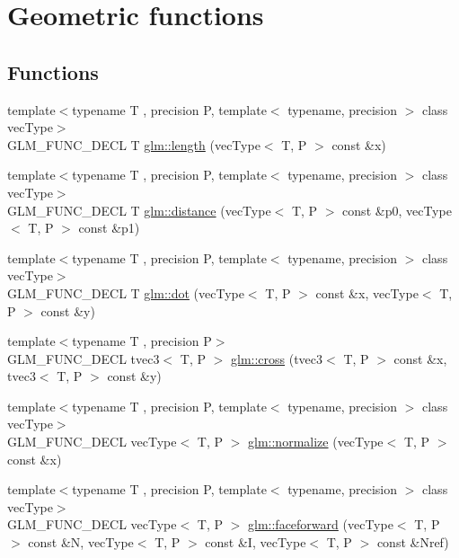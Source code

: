 \hypertarget{group__core__func__geometric}{\section{Geometric functions}
\label{group__core__func__geometric}
}
\subsection*{Functions}
\begin{DoxyCompactItemize}
\item 
{\footnotesize template$<$typename T , precision P, template$<$ typename, precision $>$ class vec\-Type$>$ }\\G\-L\-M\-\_\-\-F\-U\-N\-C\-\_\-\-D\-E\-C\-L T \hyperlink{group__core__func__geometric_ga18d45e3d4c7705e67ccfabd99e521604}{glm\-::length} (vec\-Type$<$ T, P $>$ const \&x)
\item 
{\footnotesize template$<$typename T , precision P, template$<$ typename, precision $>$ class vec\-Type$>$ }\\G\-L\-M\-\_\-\-F\-U\-N\-C\-\_\-\-D\-E\-C\-L T \hyperlink{group__core__func__geometric_ga7ca317dde0d7e94d920153554d4a02a8}{glm\-::distance} (vec\-Type$<$ T, P $>$ const \&p0, vec\-Type$<$ T, P $>$ const \&p1)
\item 
{\footnotesize template$<$typename T , precision P, template$<$ typename, precision $>$ class vec\-Type$>$ }\\G\-L\-M\-\_\-\-F\-U\-N\-C\-\_\-\-D\-E\-C\-L T \hyperlink{group__core__func__geometric_ga7dada304da2ba7dd3376ab4f178c3f6b}{glm\-::dot} (vec\-Type$<$ T, P $>$ const \&x, vec\-Type$<$ T, P $>$ const \&y)
\item 
{\footnotesize template$<$typename T , precision P$>$ }\\G\-L\-M\-\_\-\-F\-U\-N\-C\-\_\-\-D\-E\-C\-L tvec3$<$ T, P $>$ \hyperlink{group__core__func__geometric_gafe2cae8cb26fd44be62aee97369d0af8}{glm\-::cross} (tvec3$<$ T, P $>$ const \&x, tvec3$<$ T, P $>$ const \&y)
\item 
{\footnotesize template$<$typename T , precision P, template$<$ typename, precision $>$ class vec\-Type$>$ }\\G\-L\-M\-\_\-\-F\-U\-N\-C\-\_\-\-D\-E\-C\-L vec\-Type$<$ T, P $>$ \hyperlink{group__core__func__geometric_gada9451ec170a36fe53552812b9c03a68}{glm\-::normalize} (vec\-Type$<$ T, P $>$ const \&x)
\item 
{\footnotesize template$<$typename T , precision P, template$<$ typename, precision $>$ class vec\-Type$>$ }\\G\-L\-M\-\_\-\-F\-U\-N\-C\-\_\-\-D\-E\-C\-L vec\-Type$<$ T, P $>$ \hyperlink{group__core__func__geometric_gaea854e5aec1b5839832ac2dfc7cd3c0d}{glm\-::faceforward} (vec\-Type$<$ T, P $>$ const \&N, vec\-Type$<$ T, P $>$ const \&I, vec\-Type$<$ T, P $>$ const \&Nref)

\end{DoxyCompactItemize}
